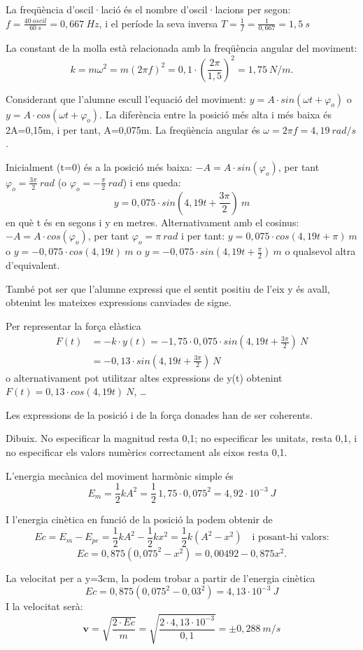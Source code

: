 \begin{solapartat}
 La freqüència d'oscil·lació és el nombre d'oscil·lacions per segon: $f = \frac{40\ oscil}{60\ s} = 0,667\ Hz$, i el període la seva inversa $T = \frac{1}{f} = \frac{1}{0,667} = 1,5\ s$

 La constant de la molla està relacionada amb la freqüència angular del moviment:
\[ k = m\omega^2 = m(2\pi f)^2 = 0,1\cdot\left(\frac{2\pi}{1,5}\right)^2 = 1,75\ N/m. \]

 Considerant que l'alumne escull l'equació del moviment: $y = A\cdot sin(\omega t + \varphi_o)$ o $y = A\cdot cos(\omega t + \varphi_o)$. La diferència entre la posició més alta i més baixa és 2A=0,15m, i per tant, A=0,075m. La freqüència angular és $\omega = 2\pi f = 4,19\ rad/s$.

 Inicialment (t=0) és a la posició més baixa: $-A = A\cdot sin(\varphi_o)$, per tant $\varphi_o = \frac{3\pi}{2}\ rad$ (o $\varphi_o = -\frac{\pi}{2}\ rad$) i ens queda:
\[ y = 0,075\cdot sin\left(4,19t + \frac{3\pi}{2}\right)\ m \]
en què t és en segons i y en metres. Alternativament amb el cosinus: $-A = A\cdot cos(\varphi_o)$, per tant $\varphi_o = \pi\ rad$ i per tant: $y = 0,075\cdot cos(4,19t + \pi)\ m$ o $y = -0,075\cdot cos(4,19t)\ m$ o $y = -0,075\cdot sin\left(4,19t + \frac{\pi}{2}\right)\ m$ o qualsevol altra d'equivalent.

També pot ser que l'alumne expressi que el sentit positiu de l'eix y és avall, obtenint les mateixes expressions canviades de signe.

 Per representar la força elàstica
\begin{align*}
F(t) &= -k\cdot y(t) = -1,75\cdot 0,075\cdot sin\left(4,19t + \frac{3\pi}{2}\right)\ N\\
&= -0,13\cdot sin\left(4,19t + \frac{3\pi}{2}\right)\ N
\end{align*}
o alternativament pot utilitzar altes expressions de y(t) obtenint $F(t) = 0,13\cdot cos(4,19t)\ N$, \ldots

Les expressions de la posició i de la força donades han de ser coherents.

 Dibuix. No especificar la magnitud resta 0,1; no especificar les unitats, resta 0,1, i no especificar els valors numèrics correctament als eixos resta 0,1.
\end{solapartat}

\begin{solapartat}
 L'energia mecànica del moviment harmònic simple és
\[ E_m = \frac{1}{2}kA^2 = \frac{1}{2}\,1,75\cdot 0,075^2 = 4,92\cdot 10^{-3}\ J \]

 I l'energia cinètica en funció de la posició la podem obtenir de
\[ Ec = E_m - E_{pe} = \frac{1}{2}kA^2 - \frac{1}{2}kx^2 = \frac{1}{2}k(A^2 - x^2) \quad\text{i posant-hi valors:} \]
\[ Ec = 0,875(0,075^2 - x^2) = 0,00492 - 0,875x^2. \]

 La velocitat per a y=3cm, la podem trobar a partir de l'energia cinètica
\[ Ec = 0,875(0,075^2 - 0,03^2) = 4,13\cdot 10^{-3}\ J \]
I la velocitat serà:
\[ \boldsymbol{v} = \sqrt{\frac{2\cdot Ec}{m}} = \sqrt{\frac{2\cdot 4,13\cdot 10^{-3}}{0,1}} = \pm 0,288\ m/s \]
\end{solapartat}
